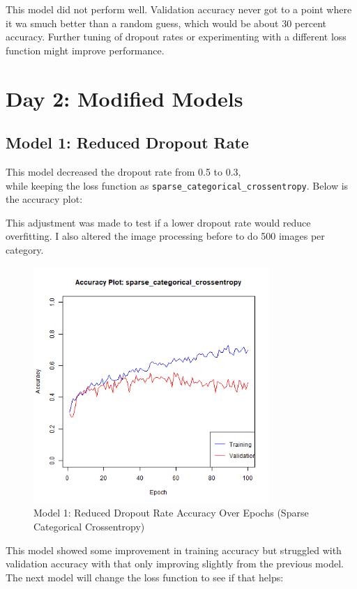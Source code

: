 \documentclass{article}
\begin{document}
This model did not perform well. Validation accuracy never got to a point where it wa smuch better than a random guess, which would be about 30 percent accuracy. Further tuning of dropout rates or experimenting with a different loss function might improve performance.

\section*{Day 2: Modified Models}

\subsection*{Model 1: Reduced Dropout Rate}
This model decreased the dropout rate from 0.5 to 0.3, \\
while keeping the loss function as \texttt{sparse\_categorical\_crossentropy}.
Below is the accuracy plot:

\sloppy
This adjustment was made to test if a lower dropout rate would reduce overfitting. I also altered the image processing before to do 500 images per category.
\sloppypar

\begin{figure}[h!]
    \centering
    \includegraphics[width=0.8\textwidth]{../results/sparse_categorical_crossentropy_accuracy_plot.png}
    \caption{Model 1: Reduced Dropout Rate Accuracy Over Epochs (Sparse Categorical Crossentropy)}
\end{figure}

This model showed some improvement in training accuracy but struggled with validation accuracy with that only improving slightly from the previous model. The next model will change the loss function to see if that helps:
\end{document}

